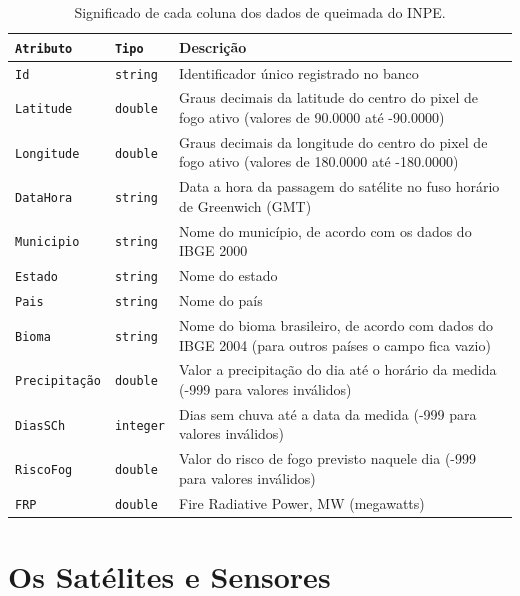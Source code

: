 \documentclass[cic,tc]{iiufrgs}
\begin{document}
\begin{table}[htbp]
\centering
\caption{Significado de cada coluna dos dados de queimada do INPE.}
\begin{tabular}{@{}llp{9cm}@{}}
 \toprule
 \texttt{Atributo} & \texttt{Tipo} & Descrição \\
 \midrule
 \texttt{Id} & \texttt{string} & Identificador único registrado no banco \\
 \texttt{Latitude} & \texttt{double} & Graus decimais da latitude do centro 
                     do pixel de fogo ativo (valores de 90.0000 até -90.0000) \\ 
 \texttt{Longitude} & \texttt{double} & Graus decimais da longitude do centro 
                     do pixel de fogo ativo (valores de 180.0000 até -180.0000) \\  
 \texttt{DataHora} & \texttt{string} & Data a hora da passagem do satélite no fuso 
                     horário de Greenwich (GMT) \\   
 \texttt{Municipio} & \texttt{string} & Nome do município, de acordo com os dados 
                     do IBGE 2000 \\
 \texttt{Estado} & \texttt{string} & Nome do estado \\
 \texttt{Pais} & \texttt{string} & Nome do país \\  
 \texttt{Bioma} & \texttt{string} & Nome do bioma brasileiro, de acordo com 
                     dados do IBGE 2004 (para outros países o campo fica vazio) \\
 \texttt{Precipitação} & \texttt{double} & Valor a precipitação do dia até 
                     o horário da medida (-999 para valores inválidos) \\
 \texttt{DiasSCh} & \texttt{integer} & Dias sem chuva até a data da medida 
                     (-999 para valores inválidos) \\
 \texttt{RiscoFog} & \texttt{double} & Valor do risco de fogo previsto naquele dia 
                     (-999 para valores inválidos) \\
 \texttt{FRP} & \texttt{double} & Fire Radiative Power, MW (megawatts) \\
 \bottomrule
\end{tabular}
\label{table:inpeColumns}
\end{table}

\section{Os Satélites e Sensores}
\end{document}
